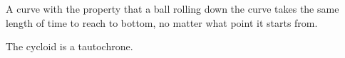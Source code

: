  A curve with the property that a ball rolling down the curve takes the
same length of time to reach to bottom, no matter what point it
starts from.
\par
The cycloid is a tautochrone.
